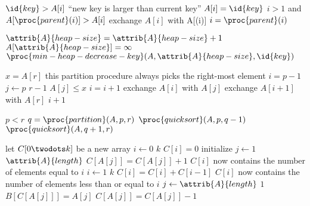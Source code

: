 \documentclass[12pt]{article}
\begin{document}
\begin{codebox}
\li \If $\id{key} > A[i]$
\li     \Then
            \Error ``new key is larger than current key''
        \End
\li $A[i] = \id{key}$
\li \While $i > 1$ and $A[\proc{parent}(i)] > A[i]$
\li     \Do
            exchange $A[i]$ with A[(i)]
\li         $i = \proc{parent}(i)$
        \End
\end{codebox}

\begin{codebox}
\li $\attrib{A}{heap-size} = \attrib{A}{heap-size} + 1$
\li $A[\attrib{A}{heap-size}] = \infty$
\li $\proc{min-heap-decrease-key}(A, \attrib{A}{heap-size}, \id{key})$
\end{codebox}

\newpage

\begin{codebox}
\li $x = A[r]$ \Comment this partition procedure always picks the right-most element 
\li $i = p-1$
\li \For $j \gets p$ \To $r-1$
    \Do
\li     \If $A[j] \leq x$
            \Then
\li             $i = i + 1$
\li             exchange $A[i]$ with $A[j]$
            \End
    \End
\li exchange $A[i+1]$ with $A[r]$
\li \Return $i + 1$
\end{codebox}

\begin{codebox}
\li \If $p < r$
\li \Then
        $q = \proc{partition}(A, p, r)$
\li     $\proc{quicksort}(A, p, q-1)$
\li     $\proc{quicksort}(A, q+1, r)$
    \End
\end{codebox}

\begin{codebox}
\li let $C[0 \twodots k]$ be a new array
\li \For $i \gets 0$ \To $k$
\li \Do 
        $C[i] = 0$ \Comment initialize
    \End
\li \For $j \gets 1$ \To $\attrib{A}{length}$
\li \Do
        $C[A[j]] = C[A[j]] + 1$
    \End
\li \Comment $C[i]$ now contains the number of elements equal to $i$
\li \For $i \gets 1$ \To $k$
\li \Do
        $C[i] = C[i] + C[i-1]$
    \End
\li \Comment $C[i]$ now contains the number of elements less than or equal to $i$
\li \For $j \gets \attrib{A}{length}$ \Downto $1$
\li \Do
        $B[C[A[j]]] = A[j]$
\li    $C[A[j]] = C[A[j]] - 1$
    \End
\end{codebox}
\end{document}
